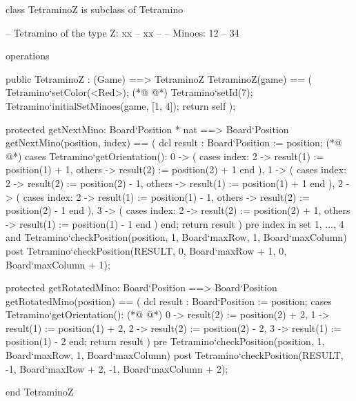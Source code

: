 \begin{vdmpp}[breaklines=true]
class TetraminoZ is subclass of Tetramino
  
 -- Tetramino of the type Z: xx
 --        xx
 --
 -- Minoes:      12
 --          34
 

 operations
 
  public TetraminoZ : (Game) ==> TetraminoZ
  TetraminoZ(game) == (
   Tetramino`setColor(<Red>);
(*@
\label{TetraminoZ:15}
@*)
   Tetramino`setId(7);
   Tetramino`initialSetMinoes(game, [1, 4]);
   return self
  );

  protected getNextMino: Board`Position * nat ==> Board`Position
  getNextMino(position, index) == (
   dcl result : Board`Position := position;
(*@
\label{getNextMino:23}
@*)
   cases Tetramino`getOrientation():
    0 -> (
     cases index:
      2 -> result(1) := position(1) + 1,
      others -> result(2) := position(2) + 1
     end
    ),
    1 -> (
     cases index:
      2 -> result(2) := position(2) - 1,
      others -> result(1) := position(1) + 1
     end
    ),
    2 -> (
     cases index:
      2 -> result(1) := position(1) - 1,
      others -> result(2) := position(2) - 1
     end
    ),
    3 -> (
     cases index:
      2 -> result(2) := position(2) + 1,
      others -> result(1) := position(1) - 1
     end
    )
   end;
   return result
  )
  pre index in set {1, ..., 4} 
   and Tetramino`checkPosition(position, 1, Board`maxRow, 1, Board`maxColumn)
  post Tetramino`checkPosition(RESULT, 0, Board`maxRow + 1, 0, Board`maxColumn + 1);
   
  protected getRotatedMino: Board`Position ==> Board`Position
  getRotatedMino(position) == (
   dcl result : Board`Position := position;
   cases Tetramino`getOrientation():
(*@
\label{getRotatedMino:59}
@*)
    0 -> result(2) := position(2) + 2,
    1 -> result(1) := position(1) + 2,
    2 -> result(2) := position(2) - 2,
    3 -> result(1) := position(1) - 2
   end;
   return result
  )
  pre Tetramino`checkPosition(position, 1, Board`maxRow, 1, Board`maxColumn)
  post Tetramino`checkPosition(RESULT, -1, Board`maxRow + 2, -1, Board`maxColumn + 2);

end TetraminoZ
\end{vdmpp}
